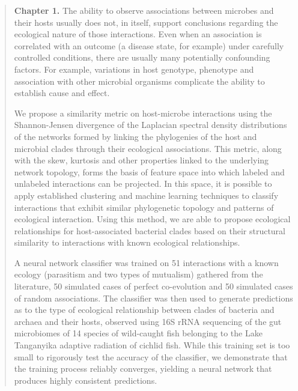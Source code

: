 \begin{quote}
\noindent\textbf{Chapter 1.} The ability to observe associations between microbes and their hosts usually does not, in itself, support conclusions regarding the ecological nature of those interactions. Even when an association is correlated with an outcome (a disease state, for example) under carefully controlled conditions, there are usually many potentially confounding factors. For example, variations in host genotype, phenotype and association with other microbial organisms complicate the ability to establish cause and effect.

We propose a similarity metric on host-microbe interactions using the Shannon-Jensen divergence of the Laplacian spectral density distributions of the networks formed by linking the phylogenies of the host and microbial clades through their ecological associations. This metric, along with the skew, kurtosis and other properties linked to the underlying network topology, forms the basis of feature space into which labeled and unlabeled interactions can be projected. In this space, it is possible to apply established clustering and machine learning techniques to classify interactions that exhibit similar phylogenetic topology and patterns of ecological interaction. Using this method, we are able to propose ecological relationships for host-associated bacterial clades based on their structural similarity to interactions with known ecological relationships.

A neural network classifier was trained on 51 interactions with a known ecology (parasitism and two types of mutualism) gathered from the literature, 50 simulated cases of perfect co-evolution and 50 simulated cases of random associations. The classifier was then used to generate predictions as to the type of ecological relationship between clades of bacteria and archaea and their hosts, observed using 16S rRNA sequencing of the gut microbiomes of 14 species of wild-caught fish belonging to the Lake Tanganyika adaptive radiation of cichlid fish. While this training set is too small to rigorously test the accuracy of the classifier, we demonstrate that the training process reliably converges, yielding a neural network that produces highly consistent predictions.
\end{quote}

